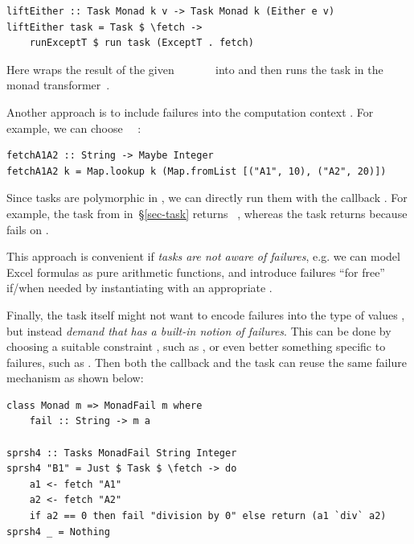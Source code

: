 \vspace{1mm}
\begin{verbatim}
liftEither :: Task Monad k v -> Task Monad k (Either e v)
liftEither task = Task $ \fetch ->
    runExceptT $ run task (ExceptT . fetch)
\end{verbatim}
\vspace{1mm}

\noindent
Here  wraps the result of the given
~\hs{::}~~\hs{->}~~~ into 
and then runs the task in the  monad transformer~\cite{liang1995monad}.

Another approach is to include failures into the computation context . For
example, we can choose ~\hs{=}~:

\vspace{1mm}
\begin{verbatim}
fetchA1A2 :: String -> Maybe Integer
fetchA1A2 k = Map.lookup k (Map.fromList [("A1", 10), ("A2", 20)])
\end{verbatim}
\vspace{1mm}

\noindent
Since tasks are polymorphic in , we can directly run them with the
callback . For example, the task  from
 in~\S\ref{sec-task} returns ~, whereas the task
 returns  because  fails on .

This approach is convenient if \emph{tasks are not aware of failures}, e.g. we
can model Excel formulas as pure arithmetic functions, and introduce failures
``for free'' if/when needed by instantiating  with an appropriate
.

Finally, the task itself might not want to encode failures into the type of
values , but instead \emph{demand that}  \emph{has a built-in notion
of failures}. This can be done by choosing a suitable constraint , such as
,  or even better something specific to failures,
such as . Then both the callback and the task can reuse the same
failure mechanism as shown below:

\vspace{1mm}
\begin{verbatim}
class Monad m => MonadFail m where
    fail :: String -> m a

sprsh4 :: Tasks MonadFail String Integer
sprsh4 "B1" = Just $ Task $ \fetch -> do
    a1 <- fetch "A1"
    a2 <- fetch "A2"
    if a2 == 0 then fail "division by 0" else return (a1 `div` a2)
sprsh4 _ = Nothing
\end{verbatim}
\vspace{1mm}

